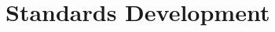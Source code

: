 \documentclass[a4paper,10pt]{article}
\begin{document}
\begin{tabular*}{\textwidth}{@{\extracolsep{\fill}} s | t u}






\end{tabular*}

\section{Standards Development}
\end{document}
